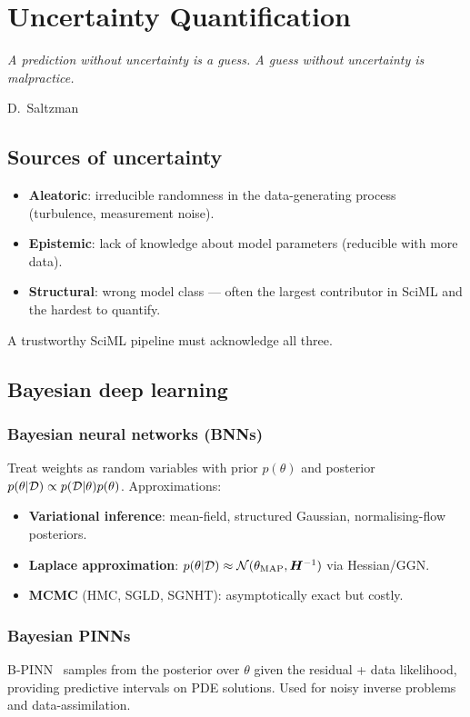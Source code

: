 \chapter{Uncertainty Quantification}
\label{ch:uq}

\epigraph{\itshape A prediction without uncertainty is a guess. A guess
without uncertainty is malpractice.}{D.\ Saltzman}

\section{Sources of uncertainty}
\begin{itemize}
\item \textbf{Aleatoric}: irreducible randomness in the data-generating
process (turbulence, measurement noise).
\item \textbf{Epistemic}: lack of knowledge about model parameters
(reducible with more data).
\item \textbf{Structural}: wrong model class --- often the largest
contributor in SciML and the hardest to quantify.
\end{itemize}
A trustworthy SciML pipeline must acknowledge all three.

\section{Bayesian deep learning}
\subsection{Bayesian neural networks (BNNs)}
Treat weights as random variables with prior $p(\theta)$ and posterior
$p(\theta|\mathcal{D})\propto p(\mathcal{D}|\theta)p(\theta)$. Approximations:
\begin{itemize}
\item \textbf{Variational inference}: mean-field, structured Gaussian,
normalising-flow posteriors.
\item \textbf{Laplace approximation}: $p(\theta|\mathcal{D})\approx
\mathcal{N}(\theta_{\text{MAP}},\bm{H}^{-1})$ via Hessian/GGN.
\item \textbf{MCMC} (HMC, SGLD, SGNHT): asymptotically exact but costly.
\end{itemize}

\subsection{Bayesian PINNs}
B-PINN~\cite{yang2021bpinn} samples from the posterior over
$\theta$ given the residual + data likelihood, providing predictive
intervals on PDE solutions. Used for noisy inverse problems and
data-assimilation.

